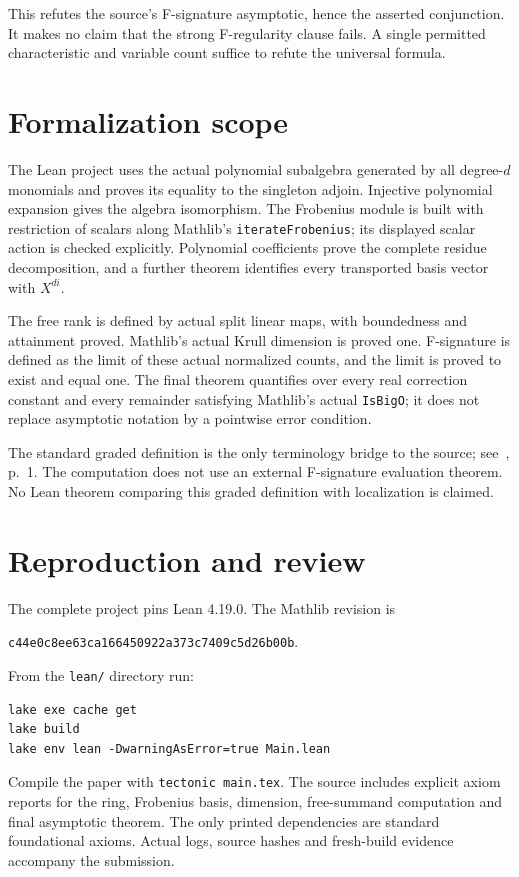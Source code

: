 \documentclass[11pt]{article}
\begin{document}
This refutes the source's F-signature asymptotic, hence the
asserted conjunction. It makes no claim that the strong
F-regularity clause fails. A single permitted characteristic and
variable count suffice to refute the universal formula.

\section*{Formalization scope}
The Lean project uses the actual polynomial subalgebra generated by
all degree-$d$ monomials and proves its equality to the singleton
adjoin. Injective polynomial expansion gives the algebra isomorphism.
The Frobenius module is built with restriction of scalars along
Mathlib's \texttt{iterateFrobenius}; its displayed scalar action is
checked explicitly. Polynomial coefficients prove the complete
residue decomposition, and a further theorem identifies every
transported basis vector with $X^{di}$.

The free rank is defined by actual split linear maps, with boundedness
and attainment proved. Mathlib's actual Krull dimension is proved
one. F-signature is defined as the limit of these actual normalized
counts, and the limit is proved to exist and equal one. The final
theorem quantifies over every real correction constant and every
remainder satisfying Mathlib's actual \texttt{IsBigO}; it does not
replace asymptotic notation by a pointwise error condition.

The standard graded definition is the only terminology bridge to
the source; see~\cite{Singh}, p.~1. The computation does not use
an external F-signature evaluation theorem. No Lean theorem
comparing this graded definition with localization is claimed.

\newpage
\section*{Reproduction and review}
The complete project pins Lean 4.19.0. The Mathlib revision is
\begin{center}
\texttt{c44e0c8ee63ca166450922a373c7409c5d26b00b}.
\end{center}
From the \texttt{lean/} directory run:
\begin{verbatim}
lake exe cache get
lake build
lake env lean -DwarningAsError=true Main.lean
\end{verbatim}
Compile the paper with \texttt{tectonic main.tex}.
The source includes explicit axiom reports for the ring,
Frobenius basis, dimension, free-summand computation and final
asymptotic theorem. The only printed dependencies are standard
foundational axioms. Actual logs, source hashes and fresh-build
evidence accompany the submission.
\end{document}

